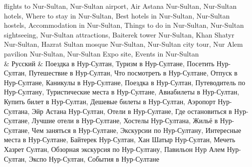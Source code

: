 \begin{longtblr}[
  label = none,
  entry = none,
]
			flights to Nur-Sultan, Nur-Sultan airport, Air Astana Nur-Sultan,
			Nur-Sultan hotels, Where to stay in Nur-Sultan, Best hotels in
			Nur-Sultan, Nur-Sultan hostels, Accommodation in Nur-Sultan,
			Things to do in Nur-Sultan, Nur-Sultan sightseeing, Nur-Sultan
			attractions, Baiterek tower Nur-Sultan, Khan Shatyr Nur-Sultan,
			Hazrat Sultan mosque Nur-Sultan, Nur-Sultan city tour, Nur Alem
			pavilion Nur-Sultan, Nur-Sultan Expo site, Events in Nur-Sultan\\
 & Русский & Поездка
			в Нур-Султан, Туризм в Нур-Султане,
			Посетить Нур-Султан, Путешествие в
			Нур-Султан, Что посмотреть в Нур-Султане,
			Отпуск в Нур-Султане, Каникулы в
			Нур-Султане, Поездка в Нур-Султан,
			Путеводитель по Нур-Султану, Туристические
			места в Нур-Султане, Авиабилеты в
			Нур-Султан, Купить билет в Нур-Султан,
			Дешевые билеты в Нур-Султан, Аэропорт
			Нур-Султана, Эйр Астана Нур-Султан,
			Отели в Нур-Султане, Где остановиться
			в Нур-Султане, Лучшие отели в Нур-Султане,
			Хостелы Нур-Султана, Жильё в Нур-Султане,
			Чем заняться в Нур-Султане, Экскурсии
			по Нур-Султану, Интересные места в
			Нур-Султане, Байтерек Нур-Султан, Хан
			Шатыр Нур-Султан, Мечеть Хазрет Султан,
			Обзорная экскурсия по Нур-Султану,
			Павильон Нур Алем Нур-Султан, Экспо
			Нур-Султан, События в Нур-Султане
\end{longtblr}


